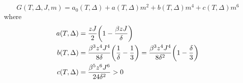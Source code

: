\documentclass[../main/main.tex]{subfiles}
\begin{document}
\begin{exercise}
\begin{equation}
  G (T, \Delta , J, m) = a_0 (T,\Delta ) + a(T, \Delta )m^2 + b (T, \Delta ) m^4 + c(T, \Delta )m^6
\end{equation}
where
\begin{subequations}
\begin{align}
  a(T,\Delta ) &= \frac{z J}{2} \qty(1 - \frac{\beta z J}{\delta })   \\
  b(T,\Delta ) &= \frac{\beta ^3 z^4 J^4}{8 \delta } \qty(\frac{1}{\delta } - \frac{1}{3}) = \frac{\beta ^3 z^4 J^4}{8 \delta^2 } \qty(1 - \frac{\delta }{3})    \\
  c(T,\Delta ) &= \frac{\beta ^5 z^6 J^6}{24 \delta^2 } > 0
\end{align}
\end{subequations}

\end{exercise}
\end{document}
